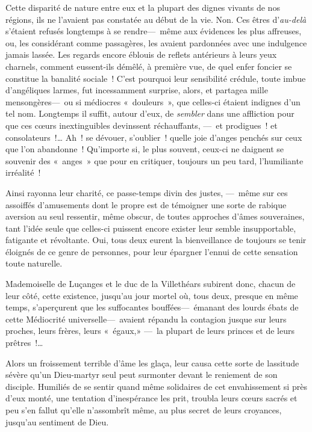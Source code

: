 \documentclass[french,twoside]{book} %
\begin{document}
Cette disparité de nature entre eux et la plupart des dignes vivants de nos régions, ils ne l’avaient pas constatée au début de la vie. Non. Ces êtres d’\emph{au-delà} s’étaient refusés longtemps à se rendre— même aux évidences les plus affreuses, ou, les considérant comme passagères, les avaient pardonnées avec une indulgence jamais lassée. Les regards encore éblouis de reflets antérieurs à leurs yeux charnels, comment eussent-ils démêlé, à première vue, de quel enfer foncier se constitue la banalité sociale ! C’est pourquoi leur sensibilité crédule, toute imbue d’angéliques larmes, fut incessamment surprise, alors, et partagea mille mensongères— ou si médiocres « douleurs », que celles-ci étaient indignes d’un tel nom. Longtemps il suffit, autour d’eux, de \emph{sembler} dans une affliction pour que ces cœurs inextinguibles devinssent réchauffants, — et prodigues ! et consolateurs !… Ah ! se dévouer, s’oublier ! quelle joie d’anges penchés sur ceux que l’on   abandonne ! Qu’importe si, le plus souvent, ceux-ci ne daignent se souvenir des « anges » que pour en critiquer, toujours un peu tard, l’humiliante irréalité !\par
Ainsi rayonna leur charité, ce passe-temps divin des justes, — même sur ces assoiffés d’amusements dont le propre est de témoigner une sorte de rabique aversion au seul ressentir, même obscur, de toutes approches d’âmes souveraines, tant l’idée seule que celles-ci puissent encore exister leur semble insupportable, fatigante et révoltante. Oui, tous deux eurent la bienveillance de toujours se tenir éloignés de ce genre de personnes, pour leur épargner l’ennui de cette sensation toute naturelle.\par
Mademoiselle de Luçanges et le duc de la Villethéars subirent donc, chacun de leur côté, cette existence, jusqu’au jour mortel où, tous deux, presque en même temps, s’aperçurent que les suffocantes bouffées— émanant des lourds ébats de cette Médiocrité universelle— avaient répandu la contagion jusque sur leurs   proches, leurs frères, leurs « égaux,» — la plupart de leurs princes et de leurs prêtres !…\par
Alors un froissement terrible d’âme les glaça, leur causa cette sorte de lassitude sévère qu’un Dieu-martyr seul peut surmonter devant le reniement de son disciple. Humiliés de se sentir quand même solidaires de cet envahissement si près d’eux monté, une tentation d’inespérance les prit, troubla leurs cœurs sacrés et peu s’en fallut qu’elle n’assombrît même, au plus secret de leurs croyances, jusqu’au sentiment de Dieu.\par
\end{document}
